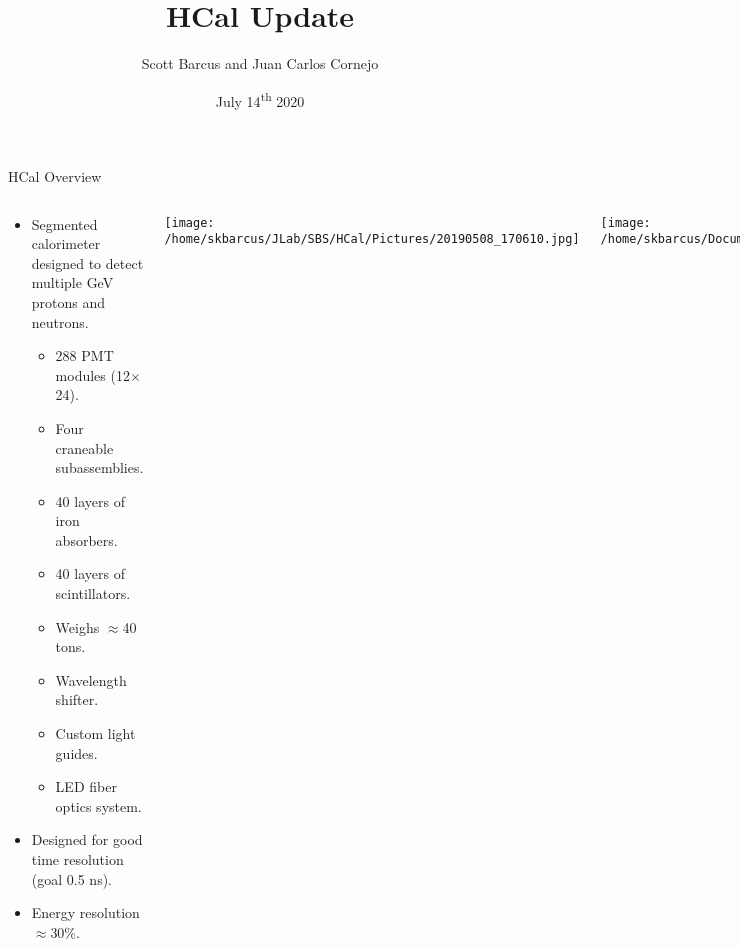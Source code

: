 \documentclass[10pt]{beamer}
\title{HCal Update}
\subtitle{}
\date{July 14\textsuperscript{th} 2020}
\author{Scott Barcus and Juan Carlos Cornejo}
\institute{Jefferson Lab}
\begin{document}
\maketitle

\begin{frame}{HCal Overview}

    \begin{columns}[T,onlytextwidth]
  	
  	\begin{center}
  	
	\begin{itemize}
		\item Segmented calorimeter designed to detect multiple GeV protons and neutrons.
		\begin{itemize}\itemsep2pt \parskip0pt 
			\item[--] 288 PMT modules (12$\times$24).
			\item[--] Four craneable subassemblies.
			\item[--] 40 layers of iron absorbers.
			\item[--] 40 layers of scintillators.
			\item[--] Weighs $\approx$40 tons.
			\item[--] Wavelength shifter.
			\item[--] Custom light guides.
			\item[--] LED fiber optics system.
		\end{itemize}
		\item Designed for \alert{good time resolution} (goal 0.5 ns).
		\item Energy resolution $\approx$30\%.
	\end{itemize}
	
	\end{center}
	
	  \begin{center}
  		\texttt{[image: /home/skbarcus/JLab/SBS/HCal/Pictures/20190508\_170610.jpg]}
  	\end{center}
	\begin{center}
  		\texttt{[image: /home/skbarcus/Documents/JLab\_SS1/Seminar/HCal\_External\_Clean.png]}
  	\end{center}
	\end{columns}

\end{frame}
\end{document}
